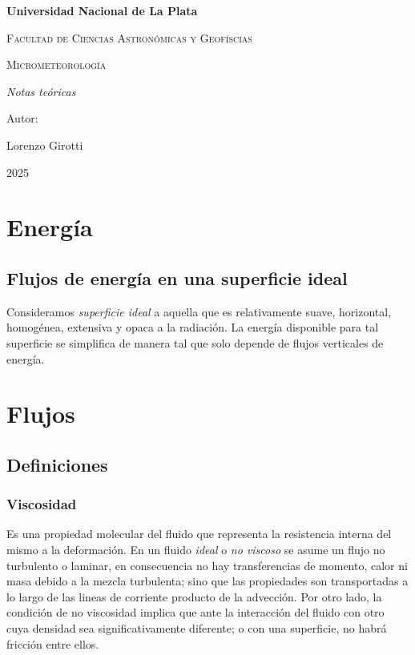 \documentclass[openany]{book}
\begin{document}
\begin{titlepage}
    \centering
    {\bfseries\LARGE Universidad Nacional de La Plata \par}\vspace{1cm}
    {\scshape\Large Facultad de Ciencias Astronómicas y Geofíscias \par}\vspace{3cm}
    {\scshape\Huge Micrometeorología \par}\vspace{3cm}
    {\itshape\Large Notas teóricas \par}
    \vfill
    {\Large Autor: \par}
    {\Large Lorenzo Girotti \par}
    \vfill
    {\Large 2025 \par}
\end{titlepage}

\sffamily


\chapter{Energía}

\section{Flujos de energía en una superficie ideal}

Consideramos \emph{superficie ideal} a aquella que es relativamente 
suave, horizontal, homogénea, extensiva y opaca a la radiación. 
La energía disponible para tal superficie se simplifica de manera 
tal que solo depende de flujos verticales de energía.

\chapter{Flujos}
\section{Definiciones}

\subsection{Viscosidad}

Es una propiedad molecular del fluido que representa la resistencia interna del mismo a la deformación. 
En un fluido \emph{ideal} o \emph{no viscoso} se asume un flujo 
no turbulento o laminar, en consecuencia no hay transferencias 
de momento, calor ni masa debido a la mezcla turbulenta; sino 
que las propiedades son transportadas a lo largo de las lineas 
de corriente producto de la advección. Por otro lado, la 
condición de no viscosidad implica que ante la interacción del 
fluido con otro cuya densidad sea significativamente diferente; 
o con una superficie, no habrá fricción entre ellos.
\end{document}
